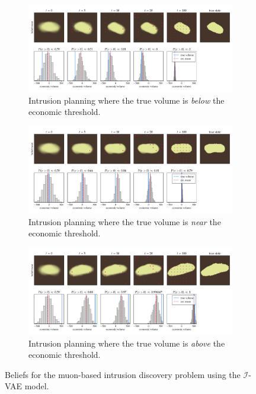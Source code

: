 \begin{figure}[p!]
    \centering
    \begin{subfigure}[t]{\linewidth}
        \centering
        \includegraphics[width=0.92\linewidth]{figures/ivae/muon/muon_planning_59.pdf}
        \caption{Intrusion planning where the true volume is \textit{below} the economic threshold.}
        \label{fig:muon_planning_under}
    \end{subfigure}
    \begin{subfigure}[t]{\linewidth}
        \centering
        \includegraphics[width=0.92\linewidth]{figures/ivae/muon/muon_planning_2.pdf}
        \caption{Intrusion planning where the true volume is \textit{near} the economic threshold.}
        \label{fig:muon_planning_zero}
    \end{subfigure}
    \begin{subfigure}[t]{\linewidth}
        \centering
        \includegraphics[width=0.92\linewidth]{figures/ivae/muon/muon_planning_82.pdf}
        \caption{Intrusion planning where the true volume is \textit{above} the economic threshold.}
        \label{fig:muon_planning_over}
    \end{subfigure}
    \caption{Beliefs for the muon-based intrusion discovery problem using the $\mathcal{I}$-VAE model.}
    \label{fig:muon_trajectories}
\end{figure}


